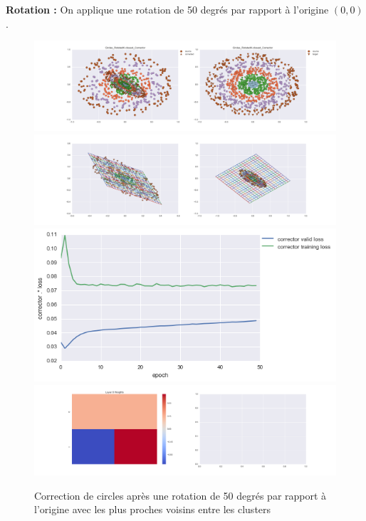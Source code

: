
{\Large \textbf{Rotation :}} On applique une rotation de 50 degrés par rapport à l'origine $(0,0)$.

\begin{figure}[H] %
\centering
\includegraphics[width=\linewidth]{fig/24-05-2016/circles/Circles_RotatedK-closest_Corrector-DATA.png}
\includegraphics[width=\linewidth]{fig/24-05-2016/circles/Circles_RotatedK-closest_Corrector-GridCheck.png}
\includegraphics[width=0.45\linewidth]{fig/24-05-2016/circles/Circles_RotatedK-closest_Corrector-Learning_curve.png}
\includegraphics[width=\linewidth]{fig/24-05-2016/circles/Circles_RotatedK-closest_Corrector-W.png}
\caption{Correction de circles après une rotation de 50 degrés par rapport à l'origine avec les plus proches voisins entre les clusters}
\label{fig:recap-circles-rot-exhaustive}
\end{figure}

